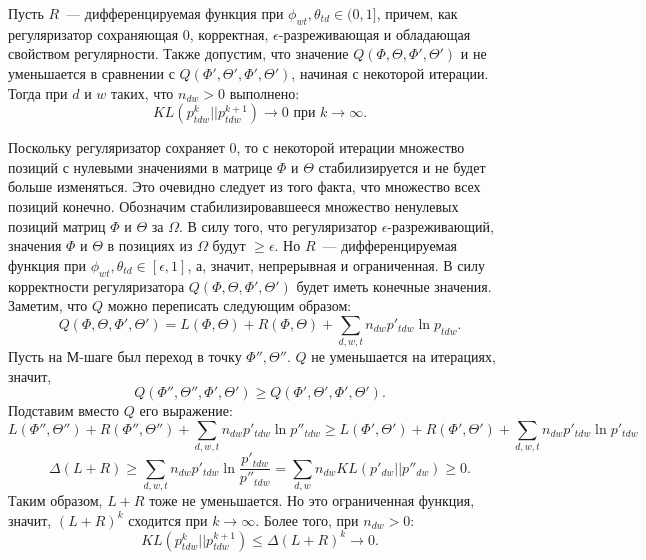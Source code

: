 \documentclass[12pt, twoside]{article}
\begin{document}
\begin{Theorem} \label{Theorem_neighbour_zero1} Пусть $R$~--- дифференцируемая функция при $\phi_{wt}, \theta_{td} \in (0, 1]$, причем, как регуляризатор сохраняющая 0, корректная, $\epsilon$-разреживающая и обладающая свойством регулярности. Также допустим,  что значение $Q(\Phi, \Theta, \Phi', \Theta')$  и не уменьшается в сравнении с $Q(\Phi', \Theta', \Phi', \Theta')$, начиная с некоторой итерации. Тогда при $d$ и $w$ таких, что $n_{dw} > 0$ выполнено:
\[
KL(p_{tdw}^{k}||p_{tdw}^{k+1}) \to 0 \text{ при }  k \to \infty.
\]
\end{Theorem}
\begin{Proof}
Поскольку регуляризатор сохраняет 0, то с некоторой итерации множество позиций с нулевыми значениями в матрице $\Phi$ и $\Theta$ стабилизируется и не будет больше изменяться. Это очевидно следует из того факта, что  множество всех позиций конечно. Обозначим стабилизировавшееся множество ненулевых позиций матриц $\Phi$ и $\Theta$ за $\Omega$. В силу того, что регуляризатор $\epsilon$-разреживающий, значения $\Phi$ и $\Theta$ в позициях из $\Omega$ будут $\geq \epsilon$. Но $R$~--- дифференцируемая функция при $\phi_{wt}, \theta_{td} \in [\epsilon, 1]$, а, значит, непрерывная и ограниченная. В силу корректности регуляризатора $Q(\Phi, \Theta, \Phi', \Theta')$  будет иметь конечные значения.
Заметим, что $Q$ можно переписать следующим образом:
\[
Q(\Phi, \Theta, \Phi', \Theta') = L(\Phi, \Theta) +  R(\Phi, \Theta) + \sum\limits_{d, w, t} n_{dw} p'_{tdw} \ln{p_{tdw}}.
\]
Пусть на М-шаге был переход в точку $\Phi'', \Theta''$. $Q$ не уменьшается на итерациях, значит,
\[
	Q(\Phi'', \Theta'', \Phi', \Theta') \geq Q(\Phi', \Theta', \Phi', \Theta').
\]
Подставим вместо $Q$ его выражение:
\[
	L(\Phi'', \Theta'') + R(\Phi'', \Theta'') + \sum\limits_{d, w, t} n_{dw} p'_{tdw} \ln{p''_{tdw}}  \geq L(\Phi', \Theta') +  R(\Phi', \Theta') + \sum\limits_{d, w, t} n_{dw} p'_{tdw} \ln{p'_{tdw}}
\]
\[
	\Delta(L +  R) \geq  \sum\limits_{d, w, t} n_{dw} p'_{tdw} \ln{\frac{p'_{tdw}}{p''_{tdw}}} = \sum\limits_{d, w} n_{dw} KL(p'_{dw} || p''_{dw}) \geq 0.
\]
Таким образом, $L +  R$  тоже не уменьшается. Но это ограниченная функция, значит, $(L + R)^{k}$ сходится при $k \to \infty$. Более того, при $n_{dw} > 0$:
\[
	KL(p_{tdw}^{k}||p_{tdw}^{k+1}) \leq \Delta (L +  R)^{k} \to 0.
\]
\end{Proof}
\end{document}
